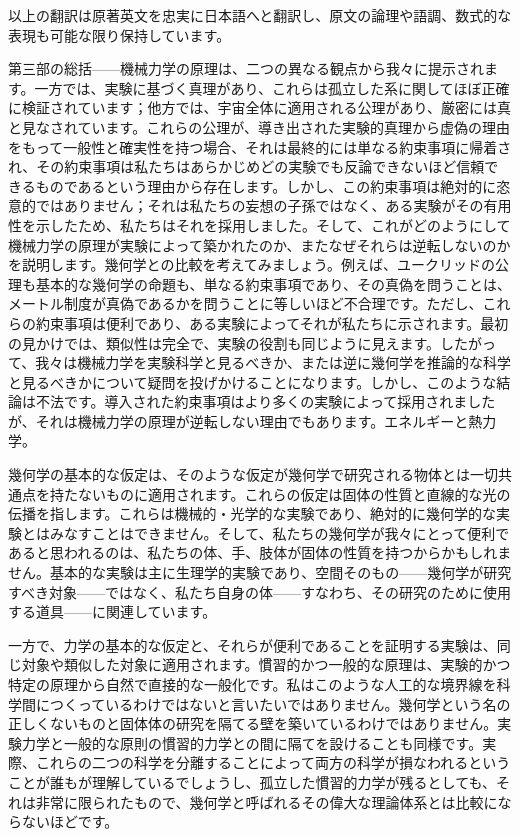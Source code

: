 \documentclass[a4paper,11pt,openany]{ltjsbook}
\begin{document}
以上の翻訳は原著英文を忠実に日本語へと翻訳し、原文の論理や語調、数式的な表現も可能な限り保持しています。

第三部の総括——機械力学の原理は、二つの異なる観点から我々に提示されます。一方では、実験に基づく真理があり、これらは孤立した系に関してほぼ正確に検証されています；他方では、宇宙全体に適用される公理があり、厳密には真と見なされています。これらの公理が、導き出された実験的真理から虚偽の理由をもって一般性と確実性を持つ場合、それは最終的には単なる約束事項に帰着され、その約束事項は私たちはあらかじめどの実験でも反論できないほど信頼できるものであるという理由から存在します。しかし、この約束事項は絶対的に恣意的ではありません；それは私たちの妄想の子孫ではなく、ある実験がその有用性を示したため、私たちはそれを採用しました。そして、これがどのようにして機械力学の原理が実験によって築かれたのか、またなぜそれらは逆転しないのかを説明します。幾何学との比較を考えてみましょう。例えば、ユークリッドの公理も基本的な幾何学の命題も、単なる約束事項であり、その真偽を問うことは、メートル制度が真偽であるかを問うことに等しいほど不合理です。ただし、これらの約束事項は便利であり、ある実験によってそれが私たちに示されます。最初の見かけでは、類似性は完全で、実験の役割も同じように見えます。したがって、我々は機械力学を実験科学と見るべきか、または逆に幾何学を推論的な科学と見るべきかについて疑問を投げかけることになります。しかし、このような結論は不法です。導入された約束事項はより多くの実験によって採用されましたが、それは機械力学の原理が逆転しない理由でもあります。エネルギーと熱力学。

幾何学の基本的な仮定は、そのような仮定が幾何学で研究される物体とは一切共通点を持たないものに適用されます。これらの仮定は固体の性質と直線的な光の伝播を指します。これらは機械的・光学的な実験であり、絶対的に幾何学的な実験とはみなすことはできません。そして、私たちの幾何学が我々にとって便利であると思われるのは、私たちの体、手、肢体が固体の性質を持つからかもしれません。基本的な実験は主に生理学的実験であり、空間そのもの——幾何学が研究すべき対象——ではなく、私たち自身の体——すなわち、その研究のために使用する道具——に関連しています。

一方で、力学の基本的な仮定と、それらが便利であることを証明する実験は、同じ対象や類似した対象に適用されます。慣習的かつ一般的な原理は、実験的かつ特定の原理から自然で直接的な一般化です。私はこのような人工的な境界線を科学間につくっているわけではないと言いたいではありません。幾何学という名の正しくないものと固体体の研究を隔てる壁を築いているわけではありません。実験力学と一般的な原則の慣習的力学との間に隔てを設けることも同様です。実際、これらの二つの科学を分離することによって両方の科学が損なわれるということが誰もが理解しているでしょうし、孤立した慣習的力学が残るとしても、それは非常に限られたもので、幾何学と呼ばれるその偉大な理論体系とは比較にならないほどです。
\end{document}
